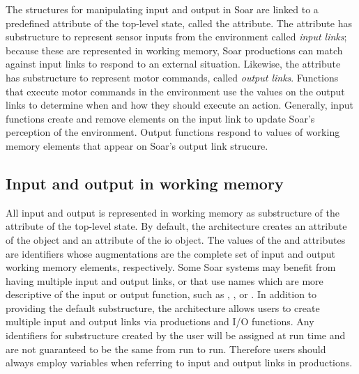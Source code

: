 The structures for manipulating input and output in Soar are linked to a predefined attribute of the top-level state, called the  attribute.  The  attribute has substructure to represent sensor inputs from the environment called \emph{input links}; because these are represented in working memory, Soar productions can match against input links to respond to an external situation. Likewise, the  attribute has substructure to represent motor commands, called \emph{output links}. Functions that execute motor commands in the environment use the values on the output links to determine when and how they should execute an action.  Generally, input functions create and remove elements on the input link to update Soar's perception of the environment.  Output functions respond to values of working memory elements that appear on Soar's output link strucure.



\subsection{Input and output in working memory}
\label{SYNTAX-io-wm}

All input and output is represented in working memory as substructure of the  attribute of the top-level state.  By default, the architecture creates an  attribute of the  object and an  attribute of the io object.  The values of the  and  attributes are identifiers whose augmentations are the complete set of input and output working memory elements, respectively.  Some Soar systems may benefit from having multiple input and output links, or that use names which are more descriptive of the input or output function, such as , , or .  In addition to providing the default  substructure, the architecture allows users to create multiple input and output links via productions and I/O functions.  Any identifiers for  substructure created by the user will be assigned at run time and are not guaranteed to be the same from run to run.  Therefore users should always employ variables when referring to input and output links in productions.

